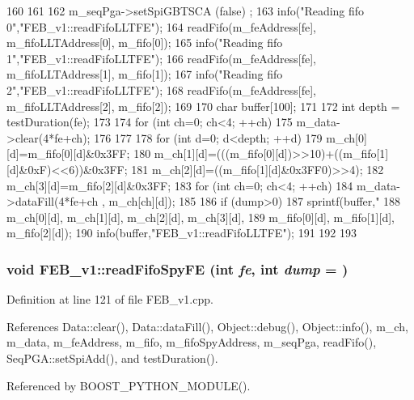 \begin{DoxyCode}
160                                              {
161 
162   m_seqPga->setSpiGBTSCA (false) ;
163   info("Reading fifo 0","FEB_v1::readFifoLLTFE");
164   readFifo(m_feAddress[fe], m_fifoLLTAddress[0], m_fifo[0]);
165   info("Reading fifo 1","FEB_v1::readFifoLLTFE");
166   readFifo(m_feAddress[fe], m_fifoLLTAddress[1], m_fifo[1]);
167   info("Reading fifo 2","FEB_v1::readFifoLLTFE");
168   readFifo(m_feAddress[fe], m_fifoLLTAddress[2], m_fifo[2]);
169   
170   char buffer[100];
171   
172   int depth = testDuration(fe);
173 
174   for (int ch=0; ch<4; ++ch){
175     m_data->clear(4*fe+ch);
176   }
177   
178   for (int d=0; d<depth; ++d){ 
179     m_ch[0][d]=m_fifo[0][d]&0x3FF;
180     m_ch[1][d]=(((m_fifo[0][d])>>10)+((m_fifo[1][d]&0xF)<<6))&0x3FF;
181     m_ch[2][d]=((m_fifo[1][d]&0x3FF0)>>4);
182     m_ch[3][d]=m_fifo[2][d]&0x3FF;
183     for (int ch=0; ch<4; ++ch){
184       m_data->dataFill(4*fe+ch , m_ch[ch][d]);
185     }
186     if (dump>0) {
187       sprintf(buffer,"%
188           m_ch[0][d], m_ch[1][d], m_ch[2][d], m_ch[3][d],
189           m_fifo[0][d], m_fifo[1][d], m_fifo[2][d]);
190       info(buffer,"FEB_v1::readFifoLLTFE");
191     }
192   }
193 }
\end{DoxyCode}
\hypertarget{classFEB__v1_a86e0ed4fc9946a184d82cefdf5e5a794}{
\subsubsection[{readFifoSpyFE}]{\setlength{\rightskip}{0pt plus 5cm}void FEB\_\-v1::readFifoSpyFE (int {\em fe}, \/  int {\em dump} = {})}}
\label{classFEB__v1_a86e0ed4fc9946a184d82cefdf5e5a794}


Definition at line 121 of file FEB\_\-v1.cpp.

References Data::clear(), Data::dataFill(), Object::debug(), Object::info(), m\_\-ch, m\_\-data, m\_\-feAddress, m\_\-fifo, m\_\-fifoSpyAddress, m\_\-seqPga, readFifo(), SeqPGA::setSpiAdd(), and testDuration().

Referenced by BOOST\_\-PYTHON\_\-MODULE().


